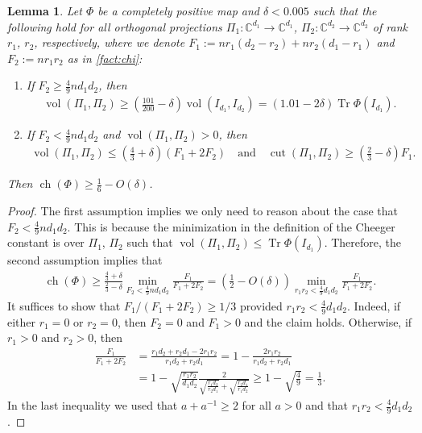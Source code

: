 \documentclass[aos]{imsart}
\newtheorem{lemma}[theorem]{Lemma}
\theoremstyle{definition}
\numberwithin{equation}{section}
\DeclareMathOperator{\vol}{vol}
\DeclareMathOperator{\cut}{cut}
\DeclareMathOperator{\ch}{ch}
\DeclareMathOperator{\tr}{Tr}
\newcommand{\C}{{\mathbb{C}}}
\begin{document}
\begin{appendix}
\begin{lemma}\label{lem:suff}
Let $\Phi$ be a completely positive map and $\delta<0.005$ such that the following hold for all orthogonal projections $\Pi_1\colon \C^{d_1} \to \C^{d_1}$, $\Pi_2 \colon \C^{d_2}\to\C^{d_2}$ of rank $r_1$, $r_2$, respectively, where we denote $F_1 := n r_1(d_2 - r_2) + n r_2(d_1-r_1)$ and $F_2 := n r_1 r_2$ as in \cref{fact:chi}:
\begin{enumerate}
\item If $F_2 \geq \frac49 n d_1 d_2$, then
\begin{align}\label{eq:vol}
  \vol(\Pi_1, \Pi_2)
\geq \left(\frac{101}{200} - \delta\right) \vol(I_{d_1}, I_{d_2})
= \left(1.01 - 2\delta\right) \tr \Phi(I_{d_1}).
\end{align}
\item If $F_2 < \frac49 n d_1 d_2$ and $\vol(\Pi_1, \Pi_2)>0$, then
\begin{align}\label{eq:cut}
  \vol(\Pi_1, \Pi_2) \leq \left(\frac43 + \delta\right)\left(F_1 + 2 F_2\right) \quad\text{and}\quad
  \cut(\Pi_1, \Pi_2) \geq \left(\frac23 - \delta\right) F_1.
\end{align}
\end{enumerate}
Then $\ch(\Phi) \geq \frac16 - O(\delta)$.
\end{lemma}
\begin{proof}
The first assumption implies we only need to reason about the case that $F_2 < \frac49 n d_1 d_2$.
This is because the minimization in the definition of the Cheeger constant is over $\Pi_1$, $\Pi_2$ such that $\vol(\Pi_1, \Pi_2) \leq \tr \Phi(I_{d_1})$.
Therefore, the second assumption implies that
\begin{align*}
  \ch(\Phi)
\geq \frac{\frac43 + \delta}{\frac23 - \delta} \min_{F_2 < \frac49 n d_1 d_2} \frac{F_1}{F_1 + 2 F_2}
= \left( \frac12 - O(\delta) \right) \min_{r_1 r_2 < \frac49 d_1 d_2} \frac{F_1}{F_1 + 2 F_2}.
\end{align*}
It suffices to show that $F_1/(F_1 + 2 F_2) \geq 1/3$ provided $r_1 r_2 < \frac49 d_1 d_2$.
Indeed, if either $r_1 = 0$ or $r_2 = 0$, then $F_2 = 0$ and $F_1>0$ and the claim holds.
Otherwise, if $r_1>0$ and $r_2>0$, then
\begin{align*}
  \frac{F_1}{F_1 + 2 F_2}
&= \frac{r_1 d_2 + r_2 d_1 - 2 r_1 r_2}{r_1 d_2 + r_2 d_1}
= 1 - \frac{2 r_1 r_2}{r_1 d_2 + r_2 d_1} \\
&= 1 - \sqrt{\frac{r_1r_2}{d_1d_2}} \frac2{\sqrt{\frac{r_1 d_2}{r_2 d_1}} + \sqrt{\frac{r_2 d_1}{r_1 d_2}}}
\geq 1 - \sqrt{\frac49}
= \frac13.
\end{align*}
In the last inequality we used that $a + a^{-1} \geq 2$ for all $a>0$ and that $r_1 r_2 < \frac49 d_1 d_2$.
\end{proof}


\end{appendix}
\end{document}
